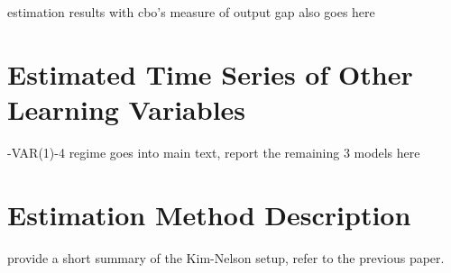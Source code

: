 \documentclass[12pt]{article}
\numberwithin{equation}{section}
\begin{document}
\begin{appendix}
estimation results with cbo's measure of output gap also goes here

\FloatBarrier

\section{Estimated Time Series of Other Learning Variables }

-VAR(1)-4 regime goes into main text, report the remaining 3 models here

\FloatBarrier

\section{Estimation Method Description}

provide a short summary of the Kim-Nelson setup, refer to the previous paper. 

\FloatBarrier



\end{appendix}
\end{document}
